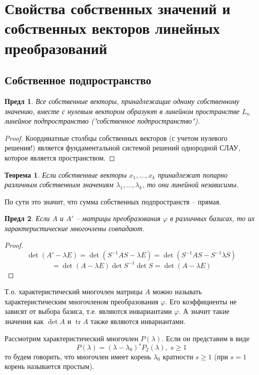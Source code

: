 \documentclass[a4paper,12pt]{article}
\DeclareMathOperator{\tr}{\mathop{tr}}
\newtheorem{theorem}{Теорема}[section]
\newtheorem{propos}{Предл}[section]
\begin{document}
\section{Свойства собственных значений и собственных векторов линейных преобразований}
\subsection{Собственное подпространство}

\begin{propos}
	Все собственные векторы, принадлежащие одному собственному значению, вместе с нулевым вектором образуют в линейном пространстве $L_n$ линейное подпространство ("собственное подпространство").
\end{propos}
\begin{proof}
	Координатные столбцы собственных векторов (с учетом нулевого решения!) является фундаментальной системой решений однородной СЛАУ, которое является пространством.
\end{proof}

\begin{theorem}
	Если собственные векторы $x_1, \ldots, x_k$ принадлежат попарно различным собственным значениям $\lambda_1, \ldots, \lambda_k$, то они линейной независимы.
\end{theorem}

По сути это значит, что сумма собственных подпространств -- прямая.

\begin{propos}
	Если $A$ и $A'$ -- матрицы преобразования $\varphi$ в различных базисах, то их характеристические многочлены совпадают.
\end{propos}
\begin{proof}
	\[ 
		\det (A' - \lambda E) = \det(S^{-1} A S - \lambda E) = \det(S^{-1} A S - S^{-1} \lambda S)
	\]
	\[
	  	= \det(A - \lambda E) \det S^{-1} \det S = \det(A - \lambda E)
	\]
	 
\end{proof}

Т.о. характеристический многочлен матрицы $A$ можно называть характеристическим многочленом преобразования $\varphi$. Его коэффициенты не зависят от выбора базиса, т.е. являются инвариантами $\varphi$. А значит такие значения как $\det A$ и $\tr A$ также являются инвариантами.

Рассмотрим характеристический многочлен $P(\lambda)$. Если он представим в виде
\[
	P(\lambda) = (\lambda - \lambda_0)^s P_2(\lambda), \; s \ge 1
\]
то будем говорить, что многочлен имеет корень $\lambda_0$ кратности $s \ge 1$ (при $s = 1$ корень называется простым).
\end{document}
